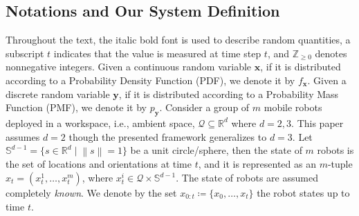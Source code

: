 \documentclass[letterpaper, 10 pt, conference]{ieeeconf}
\begin{document}
\subsection{Notations and Our System Definition}
\label{sec:sec21}
Throughout the text, the italic bold font is used to describe random quantities, a subscript $t$ indicates that the value is measured at time step $t$, and $\mathbb{Z}_{\geq 0}$ denotes nonnegative integers. %
Given a continuous random variable $\bm{x}$, if it is distributed according to a Probability Density Function (PDF), we denote it by $f_{\bm{x}}$.
Given a discrete random variable $\bm{y}$, if it is distributed according to a Probability Mass Function (PMF), we denote it by $p_{\bm{y}}$.
Consider a group of $m$ mobile robots deployed in a workspace, i.e., ambient space, $\mathcal{Q} \subseteq \mathbb{R}^d$ where $d = 2,3$. 
This paper assumes $d=2$ though the presented framework generalizes to $d=3$. 
Let $\mathbb{S}^{d-1} = \lbrace s\in \mathbb{R}^d\mid \left\| s \right\|=1 \rbrace$ be a unit circle/sphere, then the state of $m$ robots is the set of locations and orientations at time $t$, and it is represented as an $m$-tuple $x_t = (x_t^1,\dots,x_t^m)$, where $x_t^i \in \mathcal{Q} \times \mathbb{S}^{d-1}$. The state of robots are assumed completely \emph{known}.
We denote by the set ${x}_{0:t}\coloneqq \lbrace {x}_0,\dots,{x}_t \rbrace$ the robot states up to time $t$. 
\end{document}
